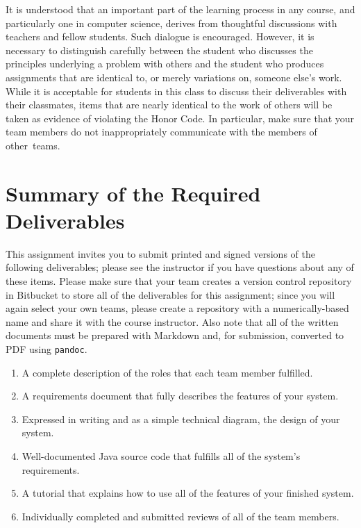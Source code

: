 \noindent It is understood that an important part of the learning process in any course, and particularly one in
computer science, derives from thoughtful discussions with teachers and fellow students.  Such dialogue is encouraged.
However, it is necessary to distinguish carefully between the student who discusses the principles underlying a problem
with others and the student who produces assignments that are identical to, or merely variations on, someone else's
work.  While it is acceptable for students in this class to discuss their deliverables with their classmates, items that
are nearly identical to the work of others will be taken as evidence of violating the Honor Code. In particular, make
sure that your team members do not inappropriately communicate with the members of \mbox{other teams}.

\section*{Summary of the Required Deliverables}

This assignment invites you to submit printed and signed versions of the following deliverables; please see the
instructor if you have questions about any of these items. Please make sure that your team creates a version control
repository in Bitbucket to store all of the deliverables for this assignment; since you will again select your own
teams, please create a repository with a numerically-based name and share it with the course instructor. Also note that
all of the written documents must be prepared with Markdown and, for submission, converted to PDF using {\tt pandoc}.

\vspace*{-.1in}
\begin{enumerate}
  \setlength{\itemsep}{0in}
  \item A complete description of the roles that each team member fulfilled.
  \item A requirements document that fully describes the features of your system.
  \item Expressed in writing and as a simple technical diagram, the design of your system.
  \item Well-documented Java source code that fulfills all of the system's requirements.
  \item A tutorial that explains how to use all of the features of your finished system.
  \item Individually completed and submitted reviews of all of the team members.
\end{enumerate}
\vspace*{-.1in}


